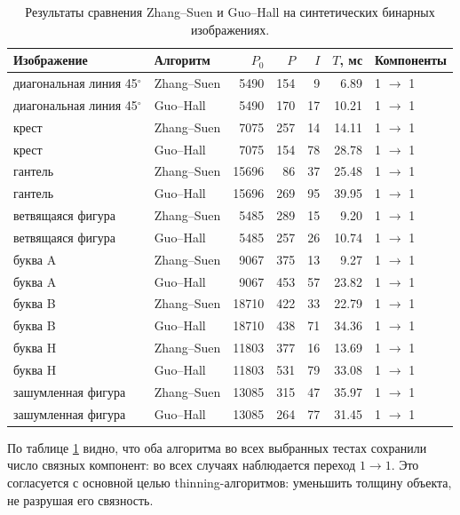 \documentclass[12pt,a4paper]{article}
\begin{document}
	\begin{table}[H]
	\centering
	\small
	\begin{tabular}{p{35mm}p{25mm}rrrrp{18mm}}
	\toprule
	Изображение & Алгоритм & $P_0$ & $P$ & $I$ & $T$, мс & Компоненты \\
	\midrule
	диагональная линия 45$^\circ$ & Zhang--Suen & 5490 & 154 & 9 & 6.89 & 1 $\to$ 1 \\
	диагональная линия 45$^\circ$ & Guo--Hall & 5490 & 170 & 17 & 10.21 & 1 $\to$ 1 \\
	крест & Zhang--Suen & 7075 & 257 & 14 & 14.11 & 1 $\to$ 1 \\
	крест & Guo--Hall & 7075 & 154 & 78 & 28.78 & 1 $\to$ 1 \\
	гантель & Zhang--Suen & 15696 & 86 & 37 & 25.48 & 1 $\to$ 1 \\
	гантель & Guo--Hall & 15696 & 269 & 95 & 39.95 & 1 $\to$ 1 \\
	ветвящаяся фигура & Zhang--Suen & 5485 & 289 & 15 & 9.20 & 1 $\to$ 1 \\
	ветвящаяся фигура & Guo--Hall & 5485 & 257 & 26 & 10.74 & 1 $\to$ 1 \\
	буква A & Zhang--Suen & 9067 & 375 & 13 & 9.27 & 1 $\to$ 1 \\
	буква A & Guo--Hall & 9067 & 453 & 57 & 23.82 & 1 $\to$ 1 \\
	буква B & Zhang--Suen & 18710 & 422 & 33 & 22.79 & 1 $\to$ 1 \\
	буква B & Guo--Hall & 18710 & 438 & 71 & 34.36 & 1 $\to$ 1 \\
	буква H & Zhang--Suen & 11803 & 377 & 16 & 13.69 & 1 $\to$ 1 \\
	буква H & Guo--Hall & 11803 & 531 & 79 & 33.08 & 1 $\to$ 1 \\
	зашумленная фигура & Zhang--Suen & 13085 & 315 & 47 & 35.97 & 1 $\to$ 1 \\
	зашумленная фигура & Guo--Hall & 13085 & 264 & 77 & 31.45 & 1 $\to$ 1 \\
	\bottomrule
	\end{tabular}
	\caption{Результаты сравнения Zhang--Suen и Guo--Hall на синтетических бинарных изображениях.}
	\label{tab:own_results}
	\end{table}
	
	По таблице \ref{tab:own_results} видно, что оба алгоритма во всех выбранных тестах сохранили число связных компонент: во всех случаях наблюдается переход $1\to1$. Это согласуется с основной целью thinning-алгоритмов: уменьшить толщину объекта, не разрушая его связность.
	
\end{document}
